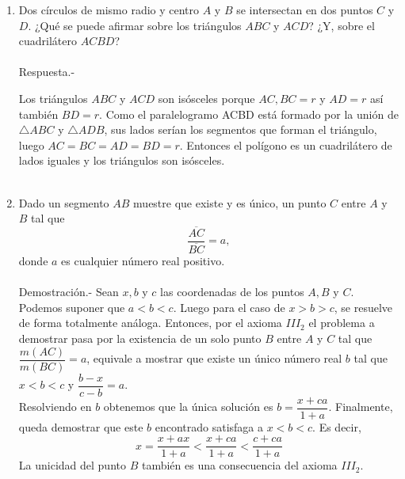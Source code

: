 \begin{enumerate}
    \item Dos círculos de mismo radio y centro $A$ y $B$ se intersectan en dos puntos $C$ y $D$. ¿Qué se puede afirmar sobre los triángulos $ABC$ y $ACD$? ¿Y, sobre el cuadrilátero $ACBD$?\\\\
    Respuesta.-\; 
    \begin{center}
    \end{center}
    Los triángulos $ABC$ y $ACD$ son isósceles porque $AC, BC = r $ y $AD = r$  así también $BD = r$. Como el paralelogramo ACBD está formado por la unión de $\triangle ABC$ y $\triangle ADB$, sus lados serían los segmentos que forman el triángulo,  luego $AC = BC = AD = BD = r$. Entonces el polígono es un cuadrilátero de lados iguales y los triángulos son isósceles.\\\\

    \item Dado un segmento $AB$ muestre que existe y es único, un punto $C$ entre $A$ y $B$ tal que $$\dfrac{\overline{AC}}{\overline{BC}}=a,$$ donde $a$ es cualquier número real positivo.\\\\
    Demostración.-\; Sean $x, b$ y $c$ las coordenadas de los puntos $A, B$ y $C$. Podemos suponer que $a <b <c$. Luego para el caso de $x> b> c$, se resuelve de forma totalmente análoga. Entonces, por el axioma $III_2$ el problema a demostrar pasa por la existencia de un solo punto $B$ entre $A$ y $C$ tal que $\dfrac{m(AC)}{m(BC)}=a$, equivale a mostrar que existe un único número real $b$ tal que $x<b<c$ y $\dfrac{b-x}{c-b}=a$.\\
    Resolviendo en $b$ obtenemos que la única solución es $b=\dfrac{x+ca}{1+a}$. Finalmente, queda demostrar que este $b$ encontrado satisfaga a $x<b<c$. Es decir,
    $$x=\dfrac{x+ax}{1+a}<\dfrac{x+ca}{1+a}<\dfrac{c+ca}{1+a}$$
    La unicidad del punto $B$ también es una consecuencia del axioma $III_2$.\\\\


\end{enumerate}
